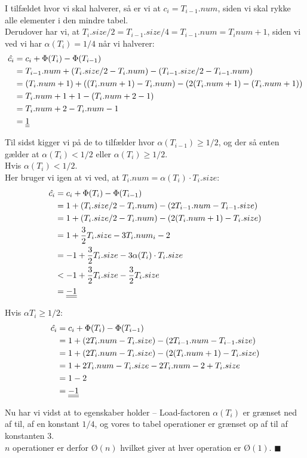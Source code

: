 I tilfældet hvor vi skal halverer, så er vi at $c_i= T_{i-1}.num$, siden vi skal rykke alle elementer i den mindre tabel.\\
Derudover har vi, at $T_{i}.size/2 = T_{i-1}.size/4 = T_{i-1}.num = T_inum + 1$, siden vi ved vi har $\alpha(T_i) = 1/4$ når vi halverer:
\begin{align*}
  \hat{c_i} &= c_i + \Phi(T_i) - \Phi(T_{i-1})\\
            &= T_{i-1}.num + (T_i.size/2 - T_i.num) - (T_{i-1}.size/2 - T_{i-1}.num)\\
            &= (T_i.num + 1) + ((T_i.num + 1) - T_i.num) - (2(T_i.num + 1) - (T_i.num + 1))\\
            &= T_i.num + 1 + 1 - (T_i.num + 2 - 1)\\
            &= T_i.num + 2 - T_i.num - 1\\
            &= \underline{\underline{1}}
\end{align*}

Til sidst kigger vi på de to tilfælder hvor $\alpha(T_{i-1}) \geq 1/2$, og der så enten gælder at $\alpha(T_i) < 1/2$ eller $\alpha(T_i) \geq 1/2$.\\

Hvis $\alpha(T_i) < 1/2$.\\
Her bruger vi igen at vi ved, at $T_i.num = \alpha(T_i)\cdot T_i.size$:
\begin{align*}
  \hat{c_i} &= c_i + \Phi(T_i) - \Phi(T_{i-1})\\
            &= 1 + (T_i.size/2 - T_i.num) - (2T_{i-1}.num - T_{i-1}.size)\\
            &= 1 + (T_i.size/2 - T_i.num) - (2(T_i.num + 1) - T_i.size)\\
            &= 1 + \frac{3}{2}T_i.size - 3T_i.num_i - 2\\
            &= -1 + \frac{3}{2}T_i.size - 3\alpha(T_i) \cdot T_i.size\\
            &< -1 + \frac{3}{2}T_i.size - \frac{3}{2}T_i.size\\
            &= \underline{\underline{-1}}
\end{align*}

Hvis $\alpha{T_i} \geq 1/2$:
\begin{align*}
  \hat{c_i} &= c_i + \Phi(T_i) - \Phi(T_{i-1})\\
            &= 1 + (2T_i.num - T_i.size) - (2T_{i-1}.num - T_{i-1}.size)\\
            &= 1 + (2T_i.num - T_i.size) - (2(T_i.num + 1) - T_i.size)\\
            &= 1 + 2T_i.num - T_i.size - 2T_i.num - 2 + T_i.size\\
            &= 1 - 2\\
            &= \underline{\underline{-1}}
\end{align*}

Nu har vi vidst at to egenskaber holder -- Load-factoren $\alpha(T_i)$ er grænset ned af til, af en konstant $1/4$, og vores to tabel operationer er grænset op af til af konstanten 3.\\
$n$ operationer er derfor $Ø(n)$ hvilket giver at hver operation er $Ø(1)$. $\blacksquare$
